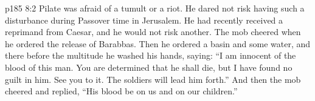 \vs p185 8:2 \pc Pilate was afraid of a tumult or a riot. He dared not risk having such a disturbance during Passover time in Jerusalem. He had recently received a reprimand from Caesar, and he would not risk another. The mob cheered when he ordered the release of Barabbas. Then he ordered a basin and some water, and there before the multitude he washed his hands, saying: “I am innocent of the blood of this man. You are determined that he shall die, but I have found no guilt in him. See you to it. The soldiers will lead him forth.” And then the mob cheered and replied, “His blood be on us and on our children.”
\quizlink
